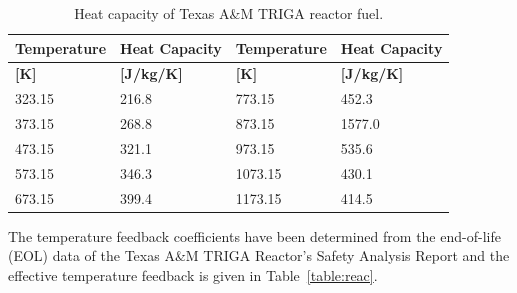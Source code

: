 \documentclass[11pt,letterpaper,titlepage]{article}
\begin{document}
\begin{table}[H]
\centering
\caption{Heat capacity of Texas A\&M TRIGA reactor fuel.}
\label{table:fuelCp}
\begin{tabular}{|l|l|l|l|}
\hline
\textbf{Temperature} & \textbf{Heat Capacity} & \textbf{Temperature} & \textbf{Heat Capacity} \\ \hline
\textbf{[K]}           & \textbf{[J/kg/K]}        & \textbf{[K]}           & \textbf{[J/kg/K]}        \\ \hline
323.15               & 216.8                  & 773.15               & 452.3                  \\ \hline
373.15               & 268.8                  & 873.15               & 1577.0                 \\ \hline
473.15               & 321.1                  & 973.15               & 535.6                  \\ \hline
573.15               & 346.3                  & 1073.15              & 430.1                  \\ \hline
673.15               & 399.4                  & 1173.15              & 414.5                  \\ \hline
\end{tabular}
\end{table}
\noindent
The temperature feedback coefficients have been determined from the end-of-life (EOL) data of the Texas A\&M TRIGA Reactor's Safety Analysis Report and the effective temperature feedback is given in Table~\ref{table:reac}.
\end{document}
